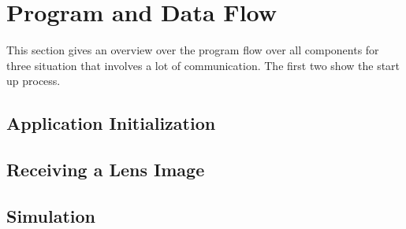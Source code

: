 \section{Program and Data Flow}
\label{sec:pd_flow}

This section gives an overview over the program flow over all components for three situation that involves a lot of communication. 
The first two show the start up process.


\subsection{Application Initialization}


\subsection{Receiving a Lens Image}


\subsection{Simulation}
